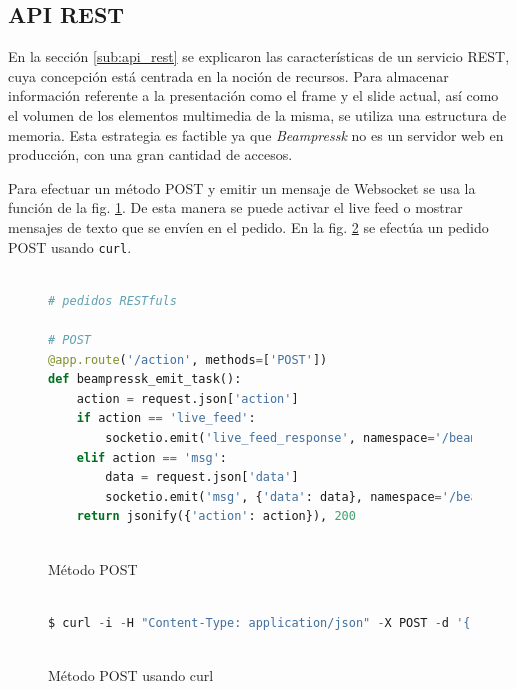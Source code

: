 		

		\subsection{API REST} %
		\label{sub:api_rest_imp}
			En la sección \ref{sub:api_rest} se explicaron las características de un servicio REST, cuya concepción está centrada en la noción de recursos. Para almacenar información referente a la presentación como el frame y el slide actual, así como el volumen de los elementos multimedia de la misma, se utiliza una estructura de memoria. Esta estrategia es factible ya que \textit{Beampressk} no es un servidor web en producción, con una gran cantidad de accesos.

			Para efectuar un método POST y emitir un mensaje de Websocket se usa la función de la fig. \ref{fig:post_method}. De esta manera se puede activar el live feed o mostrar mensajes de texto que se envíen en el pedido. En la fig. \ref{fig:curl_post} se efectúa un pedido POST usando \texttt{curl}.

			\begin{figure}[htb]%
				\begin{lstlisting}[language=Python]%

# pedidos RESTfuls

# POST
@app.route('/action', methods=['POST'])
def beampressk_emit_task():
    action = request.json['action']
    if action == 'live_feed':
        socketio.emit('live_feed_response', namespace='/beampressk')
    elif action == 'msg':
        data = request.json['data']
        socketio.emit('msg', {'data': data}, namespace='/beampressk')
    return jsonify({'action': action}), 200  
  
				\end{lstlisting}
			\caption{Método POST}
			\label{fig:post_method}
			\end{figure}			

			\begin{figure}[htb]%
				\begin{lstlisting}[language=Python]%

$ curl -i -H "Content-Type: application/json" -X POST -d '{"action":"msg", "data":"Este es un mensaje de texto"}' http://beampressk.com:5000/action
  
				\end{lstlisting}
			\caption{Método POST usando curl}
			\label{fig:curl_post}
			\end{figure}
			
